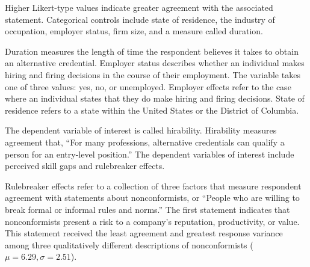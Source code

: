 Higher Likert-type values indicate greater agreement with the associated statement.
Categorical controls include state of residence,
the industry of occupation,
employer status,
firm size,
and a measure called duration.

Duration measures the length of time the respondent believes it takes to obtain an alternative credential.
Employer status describes whether an individual makes hiring and firing decisions in the course of their employment.
The variable takes one of three values: yes, no, or unemployed.
Employer effects refer to the case where an individual states that they do make hiring and firing decisions.
State of residence refers to a state within the United States or the District of Columbia.

The dependent variable of interest is called hirability.
Hirability measures agreement that, ``For many professions, alternative credentials can qualify a person for an entry-level position.''
The dependent variables of interest include perceived skill gaps and rulebreaker effects.

Rulebreaker effects refer to a collection of three factors that measure respondent agreement with statements about nonconformists, or ``People who are willing to break formal or informal rules and norms.''
The first statement indicates that nonconformists present a risk to a company's reputation, productivity, or value.
This statement received the least agreement and greatest response variance
among three qualitatively different descriptions of nonconformists ($\mu = 6.29, \sigma = 2.51$).

